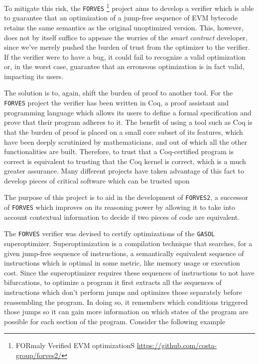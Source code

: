To mitigate this risk, the \verb|FORVES|
\footnote{FORmaly Verified EVM optimizationS \url{https://github.com/costa-group/forves2/}}
project aims to develop a verifier which is able to guarantee that an optimization of a jump-free
sequence of EVM bytecode retains the same semantics as the original unoptimized version. This, however,
does not by itself suffice to appease the worries of the \emph{smart contract} developer, since we've
merely pushed the burden of trust from the optimizer to the verifier. If the verifier were to have a
bug, it could fail to recognize a valid optimization or, in the worst case, guarantee that an erroneous
optimization is in fact valid, impacting its users.

The solution is to, again, shift the burden of proof to another tool. For the \verb|FORVES| project the 
verifier has been written in Coq, a proof assistant and programming language which allows its users to 
define a formal specification and prove that their program adheres to it. The benefit of using a tool
such as Coq is that the burden of proof is placed on a small core subset of its features, which have
been deeply scrutinized by mathematicians, and out of which all the other functionalities are built.
Therefore, to trust that a Coq-certified program is correct is equivalent to trusting that the Coq  
kernel is correct, which is a much greater assurance. 
Many different projects have taken advantage of this fact to develop pieces of critical software which
can be trusted upon \citep{ConCert}

The purpose of this project is to aid in the development of \verb|FORVES2|, a successor of \verb|FORVES|
which improves on its reasoning power by allowing it to take into account contextual information to
decide if two pieces of code are equivalent. 

The \verb|FORVES| verifier was devised to certify optimizations of the \verb|GASOL| superoptimizer. 
Superoptimization is a compilation technique that searches, for a given jump-free sequence of 
instructions, a semantically equivalent sequence of instructions which is optimal in some metric, like
memory usage or execution cost. Since the superoptimizer requires these sequences of instructions to not
have bifurcations, to optimize a program it first extracts all the sequences of instructions which don't 
perform jumps and optimizes those separately before reassembling the program. In doing so, it remembers
which conditions triggered those jumps so it can gain more information on which states of the program
are possible for each section of the program. Consider the following example

